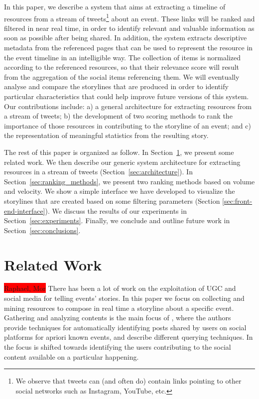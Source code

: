 \documentclass{sig-alternate}
\newcommand{\todo}[1]{\colorbox{red}{#1}}
\begin{document}
In this paper, we describe a system that aims at extracting a timeline of resources from a stream of tweets\footnote{We observe that tweets can (and often do) contain links pointing to other social networks such as Instagram, YouTube, etc.} about an event. These links will be ranked and filtered in near real time, in order to identify relevant and valuable information as soon as possible after being shared. In addition, the system extracts descriptive metadata from the referenced pages that can be used to represent the resource in the event timeline in an intelligible way. The collection of items is normalized according to the referenced resources, so that their relevance score will result from the aggregation of the social items referencing them. We will eventually analyse and compare the storylines that are produced in order to identify particular characteristics that could help improve future versions of this system. Our contributions include: a) a general architecture for extracting resources from a stream of tweets; b) the development of two scoring methods to rank the importance of those resources in contributing to the storyline of an event; and c) the representation of meaningful statistics from the resulting story.

The rest of this paper is organized as follow. In Section~\ref{sec:related-work}, we present some related work. We then describe our generic system architecture for extracting resources in a stream of tweets (Section~\ref{sec:architecture}). In Section~\ref{sec:ranking_methods}, we present two ranking methods based on volume and velocity. We show a simple interface we have developed to visualize the storylines that are created based on some filtering parameters (Section \ref{sec:front-end-interface}). We discuss the results of our experiments in Section~\ref{sec:experiments}. Finally, we conclude and outline future work in Section~\ref{sec:conclusions}.


\section{Related Work}
\label{sec:related-work}
\todo{Raphael, Mor}
There has been a lot of work on the exploitation of UGC and social media for telling events' stories. In this paper we focus on collecting and mining resources to compose in real time a storyline about a specific event. Gathering and analyzing contents is the main focus of \cite{becker:WSDM12}, where the authors provide techniques for automatically identifying posts shared by users on social platforms for apriori known events, and describe different querying techniques. In \cite{naaman:CSCW12} the focus is shifted towards identifying the users contributing to the social content available on a particular happening.
\end{document}
